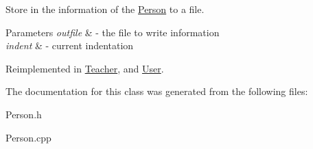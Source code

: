 Store in the information of the \mbox{\hyperlink{class_person}{Person}} to a file. 


\begin{DoxyParams}{Parameters}
{\em outfile} & -\/ the file to write information \\
\hline
{\em indent} & -\/ current indentation \\
\hline
\end{DoxyParams}


Reimplemented in \mbox{\hyperlink{class_teacher_a2ece0d60fa7ec4aaf93333aa0be0d25f}{Teacher}}, and \mbox{\hyperlink{class_user_aac5ff0f6899f3ce56d1b2d12ed557c79}{User}}.



The documentation for this class was generated from the following files\+:\begin{DoxyCompactItemize}
\item 
Person.\+h\item 
Person.\+cpp\end{DoxyCompactItemize}

